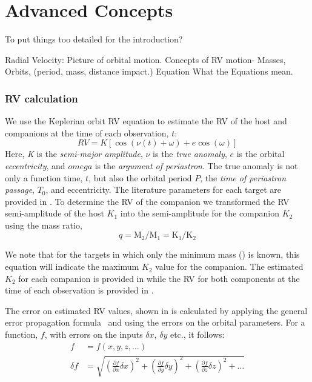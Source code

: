 
\chapter{Advanced Concepts}
\label{cha:concepts}
To put things too detailed for the introduction?


Radial Velocity:
Picture of orbital motion.
Concepts of {RV} motion-
Masses,
Orbits, (period, mass, distance impact.)
Equation
What the Equations mean.

\subsection{{RV} calculation}
We use the Keplerian orbit {RV} equation to estimate the {RV} of the host and companions at the time of each observation, \(t\):
\begin{equation}
\label{eq:rv_equation}
{RV} = K [\cos{(\nu(t) + \omega)} + e\cos{(\omega)}]
\end{equation}
Here, \emph{K} is the \emph{semi-major amplitude}, \(\nu\) is the \emph{true anomaly}, \(e\) is the orbital \emph{eccentricity}, and \(omega\) is the \emph{argument of periastron}.
The true anomaly is not only a function time, \(t\), but also the orbital period \(P\), the \emph{time of periastron passage}, \(T_0\), and eccentricity.
The literature parameters for each target are provided in .
To determine the {RV} of the companion we transformed the {RV} semi-amplitude of the host \(K_{1}\) into the semi-amplitude for the companion \(K_{2}\) using the mass ratio,
\begin{equation}
\label{eqn:mass_ratio}
q = \textrm{M}_{2} / \textrm{M}_{1} = \textrm{K}_{1} / \textrm{K}_{2}
\end{equation}

We note that for the targets in which only the minimum mass (\mtwosini) is known, this equation will indicate the maximum \(K_2\) value for the companion. The estimated \(K_2\) for each companion is provided in  while the {RV} for both components at the time of each observation is provided in .

The error on estimated {RV} values, shown in  is calculated by applying the general error propagation formula~\citep{ku_notes_1966} and using the  errors on the orbital parameters. For a function, \(f\), with errors on the inputs \(\delta x\), \(\delta y\) etc., it follows:
\begin{align}
f &= f(x, y, z, \ldots)\\
\delta f &= \sqrt{{\left( \frac{\partial f}{\partial x} \delta x\right)}^2 + {\left(\frac{\partial f}{\partial y} \delta y\right)}^2 + {\left(\frac{\partial f}{\partial z} \delta z\right)}^2 + \ldots}
\end{align}




